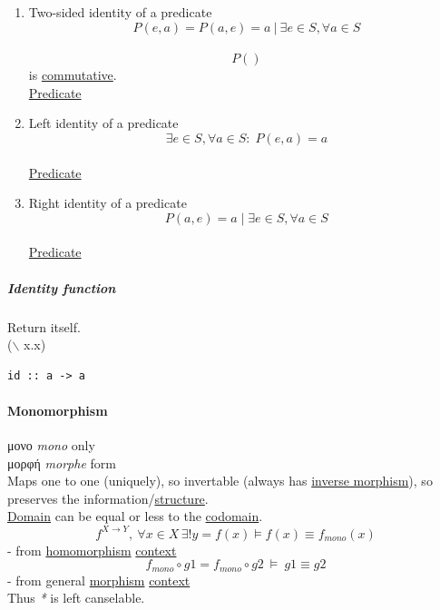 \documentclass[11pt]{article}
\begin{document}
\begin{enumerate}
\item \label{orgde5168b}Two-sided identity of a predicate
\label{sec:org037aad0}
$$ P(e,a)=P(a,e)=a \ | \ \exists e \in S, \forall a \in S $$\\
$$ P() $$ is \hyperref[orgb53f83d]{commutative}.\\

\hyperref[orgec7f705]{Predicate}\\

\item \label{org3ffe471}Left identity of a predicate
\label{sec:orgd9f0cce}
$$ \exists e \in S, \forall a \in S : \; P(e,a)=a $$\\

\hyperref[orgec7f705]{Predicate}\\

\item \label{orga9552d9}Right identity of a predicate
\label{sec:org5051a53}
$$  P(a,e)=a \; | \; \exists e \in S, \forall a \in S $$\\

\hyperref[orgec7f705]{Predicate}\\
\end{enumerate}

\subparagraph{\label{org8305d2a}Identity function}
\label{sec:org75773e8}
Return itself.\\
($\backslash$ x.x)\\
\begin{verbatim}
id :: a -> a
\end{verbatim}

\paragraph{\label{orgfde2588}Monomorphism}
\label{sec:org96aadb4}
μονο \emph{mono} only\\
μορφή \emph{morphe} form\\

Maps one to one (uniquely), so invertable (always has \hyperref[org28f7b54]{inverse morphism}), so preserves the information/\hyperref[org8051f61]{structure}.\\
\hyperref[org494b48a]{Domain} can be equal or less to the \hyperref[org410079d]{codomain}.\\

$$ f^{X \to Y}, \ \forall x \in X \, \exists! y=f(x) \vDash f(x) \equiv f_{mono}(x) $$ - from \hyperref[org4991058]{homomorphism} \hyperref[org2ec7d4f]{context}\\
$$ f_{mono} \circ g1 = f_{mono} \circ g2 \ \vDash \ g1 \equiv g2 $$ - from general \hyperref[org5de09d4]{morphism} \hyperref[org2ec7d4f]{context}\\
Thus \emph{*} is left canselable.\\
\end{document}
